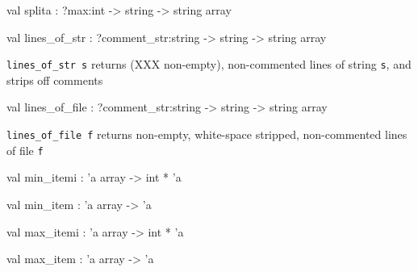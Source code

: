 \documentclass[11pt]{article}
\begin{document}
\label{val:Util.splita}\begin{ocamldoccode}
val splita : ?max:int -> string -> string array
\end{ocamldoccode}




\label{val:Util.lines-underscoreof-underscorestr}\begin{ocamldoccode}
val lines_of_str : ?comment_str:string -> string -> string array
\end{ocamldoccode}
\begin{ocamldocdescription}
{\tt{lines\_of\_str s}} returns (XXX non-empty), non-commented lines of string {\tt{s}}, and strips off comments


\end{ocamldocdescription}




\label{val:Util.lines-underscoreof-underscorefile}\begin{ocamldoccode}
val lines_of_file : ?comment_str:string -> string -> string array
\end{ocamldoccode}
\begin{ocamldocdescription}
{\tt{lines\_of\_file f}} returns non-empty, white-space stripped, non-commented lines of file {\tt{f}}


\end{ocamldocdescription}




\label{val:Util.min-underscoreitemi}\begin{ocamldoccode}
val min_itemi : 'a array -> int * 'a
\end{ocamldoccode}




\label{val:Util.min-underscoreitem}\begin{ocamldoccode}
val min_item : 'a array -> 'a
\end{ocamldoccode}




\label{val:Util.max-underscoreitemi}\begin{ocamldoccode}
val max_itemi : 'a array -> int * 'a
\end{ocamldoccode}




\label{val:Util.max-underscoreitem}\begin{ocamldoccode}
val max_item : 'a array -> 'a
\end{ocamldoccode}
\end{document}
